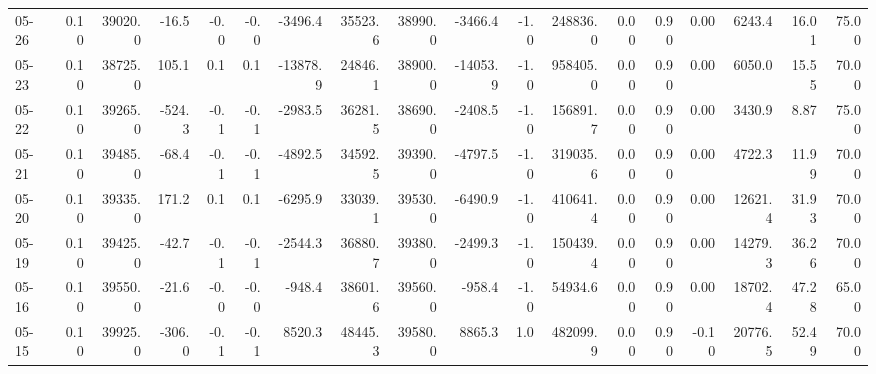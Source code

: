 \begin{threeparttable}
{\begin{tabular}{lrrrrrrrrrrrrrrrrr}
  05-26 &     0.10 & 39020.0 &             -16.5 &              -0.0 &               -0.0 &            -3496.4 & 35523.6 & 38990.0 &    -3466.4 &                     -1.0 &            248836.0 &       0.00 &      0.90 &           0.00 &           6243.4 &           16.01 &                  75.00 \\
  05-23 &     0.10 & 38725.0 &             105.1 &               0.1 &                0.1 &           -13878.9 & 24846.1 & 38900.0 &   -14053.9 &                     -1.0 &            958405.0 &       0.00 &      0.90 &           0.00 &           6050.0 &           15.55 &                  70.00 \\
  05-22 &     0.10 & 39265.0 &            -524.3 &              -0.1 &               -0.1 &            -2983.5 & 36281.5 & 38690.0 &    -2408.5 &                     -1.0 &            156891.7 &       0.00 &      0.90 &           0.00 &           3430.9 &            8.87 &                  75.00 \\
  05-21 &     0.10 & 39485.0 &             -68.4 &              -0.1 &               -0.1 &            -4892.5 & 34592.5 & 39390.0 &    -4797.5 &                     -1.0 &            319035.6 &       0.00 &      0.90 &           0.00 &           4722.3 &           11.99 &                  70.00 \\
  05-20 &     0.10 & 39335.0 &             171.2 &               0.1 &                0.1 &            -6295.9 & 33039.1 & 39530.0 &    -6490.9 &                     -1.0 &            410641.4 &       0.00 &      0.90 &           0.00 &          12621.4 &           31.93 &                  70.00 \\
  05-19 &     0.10 & 39425.0 &             -42.7 &              -0.1 &               -0.1 &            -2544.3 & 36880.7 & 39380.0 &    -2499.3 &                     -1.0 &            150439.4 &       0.00 &      0.90 &           0.00 &          14279.3 &           36.26 &                  70.00 \\
  05-16 &     0.10 & 39550.0 &             -21.6 &              -0.0 &               -0.0 &             -948.4 & 38601.6 & 39560.0 &     -958.4 &                     -1.0 &             54934.6 &       0.00 &      0.90 &           0.00 &          18702.4 &           47.28 &                  65.00 \\
  05-15 &     0.10 & 39925.0 &            -306.0 &              -0.1 &               -0.1 &             8520.3 & 48445.3 & 39580.0 &     8865.3 &                      1.0 &            482099.9 &       0.00 &      0.90 &          -0.10 &          20776.5 &           52.49 &                  70.00 \\

\end{tabular}}
\end{threeparttable}

